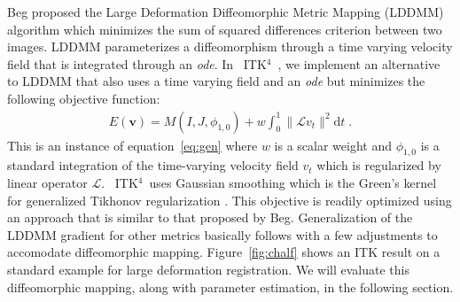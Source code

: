 \documentclass{llncs}
\newcommand{\vect}[1]{\mathbf{#1}}
\renewcommand{\v}{\vect{v}}
\newcommand{\myphi}{\phi}
\newcommand{\dd}{\text{d}}
\newcommand{\myE}{E}
\newcommand{\opL}{\mathcal{L}}
\newcommand{\tk}{~ITK$^{\text{4}}$~}
\begin{document}
Beg proposed the Large Deformation Diffeomorphic Metric Mapping
(LDDMM) algorithm \cite{Miller2005} which minimizes the sum of squared differences
criterion between two images.  LDDMM parameterizes a
diffeomorphism through a time varying velocity field that is
integrated through an {\em ode}.  In \tk, we implement an alternative
to LDDMM that also uses a time varying field and an {\em ode} but minimizes
the following objective function:
\begin{align}
\myE(\v) = M(I,J,\myphi_{1,0})
+  w \int_{0}^{1} \| \opL v_t\|^2 \dd t \;.
\label{eq:lddmm}
\end{align}
This is an instance of equation~\ref{eq:gen} where $w$ is a scalar
weight and $\myphi_{1,0}$ is a standard integration of the
time-varying velocity field $v_t$ which is regularized by linear
operator $\opL$.  \tk uses Gaussian smoothing which is the Green's
kernel for generalized Tikhonov regularization \cite{Nielsen1997}.
This objective is readily optimized using an approach that is similar
to that proposed by Beg.  Generalization of the LDDMM gradient 
for other metrics basically follows \cite{hermosillo} with a few
adjustments to accomodate diffeomorphic mapping.
Figure~\ref{fig:chalf} shows an ITK result on a standard example for large
deformation registration.  We will evaluate this diffeomorphic
mapping, along with parameter estimation, in the following section.
\end{document}
